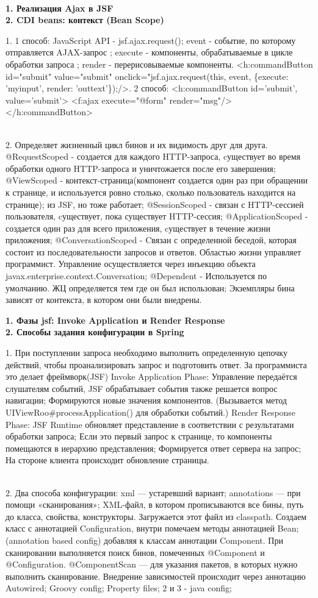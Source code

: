 \documentclass{article}
\newcommand{\bil}[4]{%
    \begin{minipage}{.3\textwidth}
        \textbf{1. #1} \\
        \textbf{2. #2}

        1. #3
        \\
        2. #4
    \end{minipage}
}
\begin{document}
\\
\bil{Реализация Ajax в JSF}{CDI beans: контекст (Bean Scope)}{
1 способ: JavaScript API - jsf.ajax.request(); event - событие, по которому отправляется AJAX-запрос
; execute - компоненты, обрабатываемые в цикле обработки запроса
; render - перерисовываемые компоненты.
<h:commandButton id="submit" value="submit"
onclick="jsf.ajax.request(this, event, \{execute: 'myinput', render: 'outtext'\});/>.
2 способ: 
<h:commandButton id='submit', value='submit'> <f:ajax execute="@form" render="msg"/></h:commandButton>
}{Определяет жизненный цикл бинов и их видимость друг для друга.
    @RequestScoped - создается для каждого HTTP-запроса, cуществует во время обработки одного HTTP-запроса и уничтожается после его завершения;
@ViewScoped - контекст-страница(компонент создается один раз при обращении к странице, и используется ровно столько, сколько пользователь находится на странице); из JSF, но тоже работает;
@SessionScoped - связан с HTTP-сессией пользователя, cуществует, пока существует HTTP-сессия;
@ApplicationScoped - создается один раз для всего приложения, cуществует в течение жизни приложения;
@ConversationScoped - Cвязан с определенной беседой, которая состоит из последовательности запросов и ответов. Областью жизни управляет программист. Управление осуществляется через инъекцию объекта javax.enterprise.context.Conversation;
@Dependent - Используется по умолчанию. ЖЦ определяется тем где он был использован; Экземпляры бина зависят от контекста, в котором они были внедрены.}
\hfill
\bil{Фазы jsf: Invoke Application и Render Response}{Способы задания конфигурации в Spring}{
    При поступлении запроса необходимо выполнить определенную цепочку действий, чтобы проанализировать запрос и подготовить ответ. За программиста это делает фреймворк(JSF)
    Invoke Application Phase: Управление передаётся слушателям событий, JSF обрабатывает события  также решается вопрос навигации; Формируются новые значения компонентов.
    (Вызывается метод UIViewRoo\#processApplication() для обработки событий.)
    Render Response Phase: JSF Runtime обновляет представление в соответствии с результатами обработки запроса; Если это первый запрос к странице, то компоненты помещаются в иерархию представления; Формируется ответ сервера на запрос; На стороне клиента происходит обновление страницы. 
}{
    Два способа конфигурации: xml — устаревший вариант; annotations — при помощи «сканирования»;
    XML-файл, в котором прописываются все бины, путь до класса, свойства, конструкторы. Загружается этот файл из classpath.
    Создаем класс с аннотацией Configuration, внутри помечаем методы аннотацией Bean; 
    (annotation based config) добавляя к классам аннотации Component. При сканировании выполняется поиск бинов,
    помеченных @Component и @Configuration. @ComponentScan — для указания пакетов, в которых нужно выполнить сканирование. Внедрение зависимостей происходит через аннотацию Autowired; 
    Groovy config;
    Property files;
    2 и 3 - java config;
}
\end{document}
